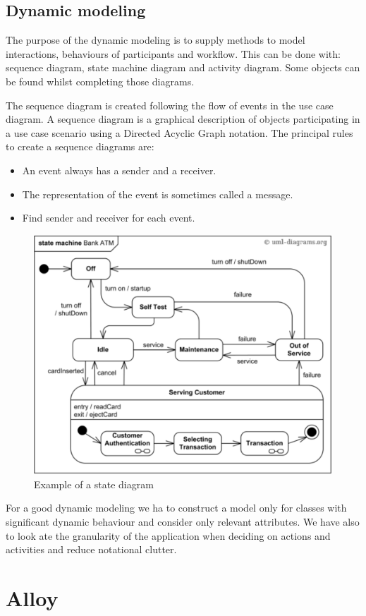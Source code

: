 \documentclass[12pt, a4paper]{report}
\theoremstyle{remark}
\begin{document}
\section{Dynamic modeling}
    The purpose of the dynamic modeling is to supply methods to model interactions, behaviours of participants and workflow. This can be done with: sequence diagram, state machine diagram and activity diagram. Some objects can be found whilst completing those diagrams.
    \par
    The sequence diagram is created following the flow of events in the use case diagram. A sequence diagram is a graphical description of objects participating in a use case scenario using a Directed Acyclic Graph notation.
    The principal rules to create a sequence diagrams are: 
    \begin{itemize}
        \item An event always has a sender and a receiver.
        \item The representation of the event is sometimes called a message.
        \item Find sender and receiver for each event.
    \end{itemize}
    \begin{figure}
        \centering
        \includegraphics[width=0.5\linewidth]{images/state.png}
        \caption{Example of a state diagram}
    \end{figure}
    \par
    For a good dynamic modeling we ha to construct a model only for classes with significant dynamic behaviour and consider only relevant attributes. We have also to look ate the granularity of the application when deciding on actions and activities and reduce notational clutter.

\newpage

\chapter{Alloy}
\end{document}
